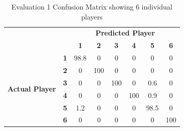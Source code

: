 \documentclass{article}
\begin{document}
{{{\begin{table}[t!]
\begin{minipage}{0.4\linewidth}
\centering
\begin{tabular}{cc|c|c|c|c|c|c|}
\cline{3-8}
\multicolumn{1}{l}{}                                          & \multicolumn{1}{l|}{} & \multicolumn{6}{c|}{\textbf{Predicted Player}}                              \\ \cline{3-8} 
\multicolumn{1}{l}{}                                          & \multicolumn{1}{l|}{} & \textbf{1} & \textbf{2} & \textbf{3} & \textbf{4} & \textbf{5} & \textbf{6} \\ \hline
\multicolumn{1}{|c|}{\multirow{6}{*}{\begin{turn}{90}\textbf{Actual Player}\end{turn}}} & \textbf{1}            & 98.8     & 0          & 0          & 0          & 0          & 0          \\ \cline{2-8} 
\multicolumn{1}{|c|}{}                                        & \textbf{2}            & 0          & 100    & 0          & 0          & 0          & 0          \\ \cline{2-8} 
\multicolumn{1}{|c|}{}                                        & \textbf{3}            & 0          & 0          & 100     & 0          & 0.6     & 0          \\ \cline{2-8} 
\multicolumn{1}{|c|}{}                                        & \textbf{4}            & 0          & 0          & 0          & 100     & 0.9     & 0          \\ \cline{2-8} 
\multicolumn{1}{|c|}{}                                        & \textbf{5}            & 1.2     & 0          & 0          & 0          & 98.5     & 0          \\ \cline{2-8} 
\multicolumn{1}{|c|}{}                                        & \textbf{6}            & 0          & 0          & 0          & 0          & 0          & 100     \\ \hline
\end{tabular}

\caption{Evaluation 1 Confusion Matrix showing 6 individual players}

\end{minipage}%

\hfill




\end{table}}}}
\end{document}
